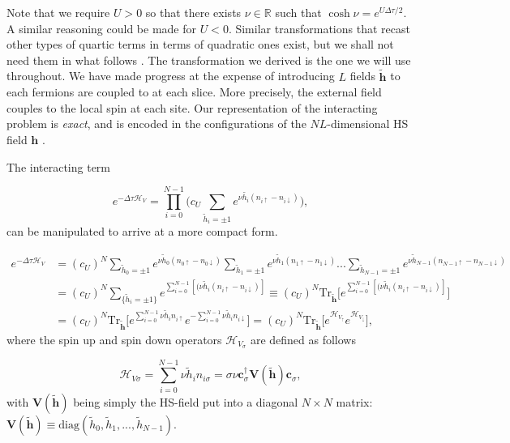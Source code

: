 Note that we require $U > 0$ so that there exists $\nu \in \mathbb{R}$ such that $\cosh \nu = e^{U\Delta \tau / 2}$. A similar reasoning could be made for $U < 0$.
Similar transformations that recast other types of quartic terms in terms of quadratic ones exist, but we shall not need them in what follows \cite{hirsch_monte_1983}.
The transformation we derived is the one we will use throughout.
We have made progress at the expense of introducing $L$ fields $\widetilde{\bm h}$ to each fermions are coupled to at each slice.
More precisely, the external field couples to the local spin at each site.
Our representation of the interacting problem is \emph{exact}, and is encoded in the configurations of the $NL$-dimensional HS field $\bm h$  \cite{hou_numerical_2009}.

The interacting term

\begin{equation} 
 e^{-\Delta\tau \mathcal{H}_V} = \prod_{i=0}^{N-1} \bigg( c_U \sum_{\widetilde{h}_i = \pm 1} e^{\nu \widetilde{h_i} ( n_{i\uparrow} - n_{i\downarrow} )} \bigg),
\end{equation} 
can be manipulated to arrive at a more compact form.

\begin{equation}\label{eq:exp_quartic}
\begin{split}
e^{-\Delta\tau \mathcal{H}_V} &=  (c_U)^N \sum_{\widetilde{h}_0 = \pm 1} e^{\nu \widetilde{h}_0 ( n_{0\uparrow} - n_{0\downarrow} )} \sum_{\widetilde{h}_1 = \pm 1} e^{\nu \widetilde{h}_1 ( n_{1\uparrow} - n_{1\downarrow} )} ... \sum_{\widetilde{h}_{N-1} = \pm 1} e^{\nu \widetilde{h}_{N-1} ( n_{N-1\uparrow} - n_{N-1\downarrow} )} \\
&= (c_U)^N \sum_{ \{ \widetilde{h}_i = \pm 1 \}} e^{\sum_{i=0}^{N-1} [(\nu \widetilde{h}_i ( n_{i\uparrow} - n_{i\downarrow} ) ]} \equiv (c_U)^N \text{Tr}_{\widetilde{\bm h}} \bigg[ e^{\sum_{i=0}^{N-1} [(\nu \widetilde{h}_i ( n_{i\uparrow} - n_{i\downarrow} ) ]} \bigg] \\
&= (c_U)^N \text{Tr}_{\widetilde{\bm h}} \bigg[ e^{\sum_{i=0}^{N-1} \nu \widetilde{h}_i n_{i\uparrow}} e^{-\sum_{i=0}^{N-1} \nu \widetilde{h}_i n_{i\downarrow}} \bigg] = (c_U)^N \text{Tr}_{\widetilde{\bm h}} \bigg[ e^{\mathcal{H}_{V_\uparrow}} e^{\mathcal{H}_{V_\downarrow}} \bigg] ,
\end{split}
\end{equation}
where the spin up and spin down operators $\mathcal{H}_{V_\sigma}$ are defined as follows

\begin{equation}
\mathcal{H}_{V\sigma} = \sum_{i=0}^{N-1} \nu \widetilde{h}_i n_{i\sigma} = \sigma \nu \bm c_\sigma^\dagger \bm V(\widetilde{\bm h}) \bm c_\sigma,
\end{equation}
with $\bm V(\widetilde{\bm h})$ being simply the HS-field put into a diagonal $N\times N$ matrix: $\bm V(\widetilde{\bm h}) \equiv \text{diag}(\widetilde{h}_0, \widetilde{h}_1, ..., \widetilde{h}_{N-1})$.

